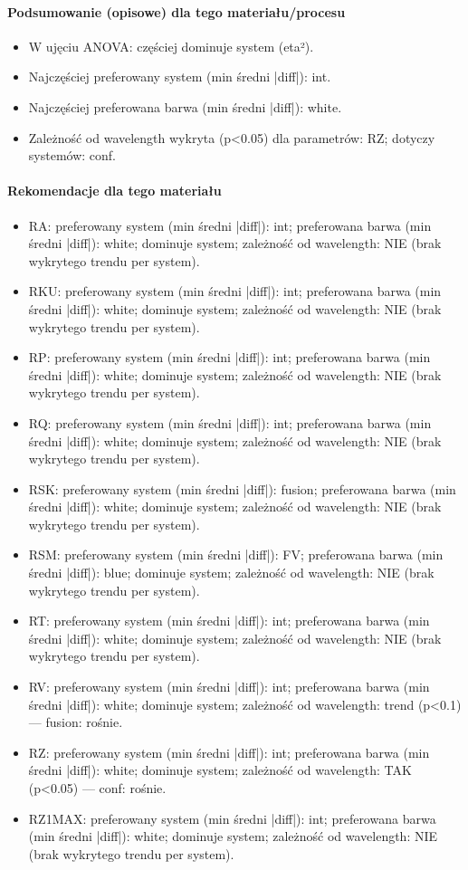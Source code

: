 \documentclass[
  10pt,
]{article}
\begin{document}
\paragraph{Podsumowanie (opisowe) dla tego materiału/procesu}
\begin{itemize}
\item W ujęciu ANOVA: częściej dominuje system (eta²).
\item Najczęściej preferowany system (min średni |diff|): int.
\item Najczęściej preferowana barwa (min średni |diff|): white.
\item Zależność od wavelength wykryta (p<0.05) dla parametrów: RZ; dotyczy systemów: conf.
\end{itemize}
\paragraph{Rekomendacje dla tego materiału}
\begin{itemize}
\item RA: preferowany system (min średni |diff|): int; preferowana barwa (min średni |diff|): white; dominuje system; zależność od wavelength: NIE (brak wykrytego trendu per system).
\item RKU: preferowany system (min średni |diff|): int; preferowana barwa (min średni |diff|): white; dominuje system; zależność od wavelength: NIE (brak wykrytego trendu per system).
\item RP: preferowany system (min średni |diff|): int; preferowana barwa (min średni |diff|): white; dominuje system; zależność od wavelength: NIE (brak wykrytego trendu per system).
\item RQ: preferowany system (min średni |diff|): int; preferowana barwa (min średni |diff|): white; dominuje system; zależność od wavelength: NIE (brak wykrytego trendu per system).
\item RSK: preferowany system (min średni |diff|): fusion; preferowana barwa (min średni |diff|): white; dominuje system; zależność od wavelength: NIE (brak wykrytego trendu per system).
\item RSM: preferowany system (min średni |diff|): FV; preferowana barwa (min średni |diff|): blue; dominuje system; zależność od wavelength: NIE (brak wykrytego trendu per system).
\item RT: preferowany system (min średni |diff|): int; preferowana barwa (min średni |diff|): white; dominuje system; zależność od wavelength: NIE (brak wykrytego trendu per system).
\item RV: preferowany system (min średni |diff|): int; preferowana barwa (min średni |diff|): white; dominuje system; zależność od wavelength: trend (p<0.1) — fusion: rośnie.
\item RZ: preferowany system (min średni |diff|): int; preferowana barwa (min średni |diff|): white; dominuje system; zależność od wavelength: TAK (p<0.05) — conf: rośnie.
\item RZ1MAX: preferowany system (min średni |diff|): int; preferowana barwa (min średni |diff|): white; dominuje system; zależność od wavelength: NIE (brak wykrytego trendu per system).
\end{itemize}
\end{document}
